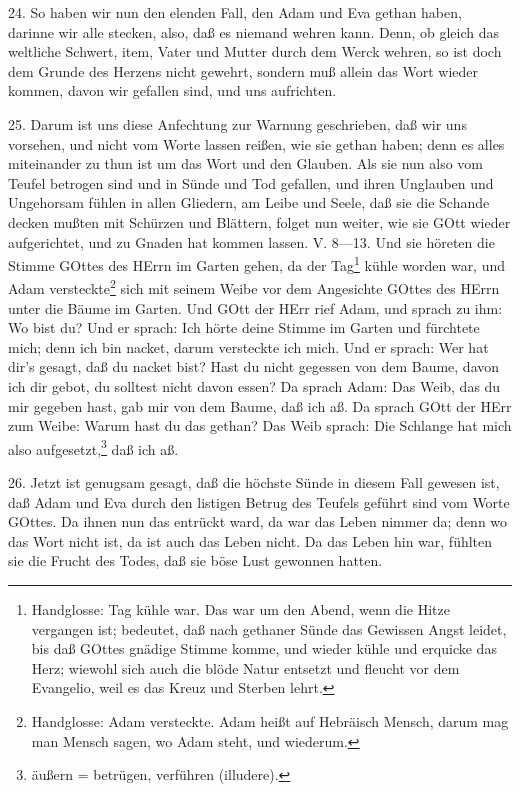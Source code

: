 24. So haben wir nun den elenden Fall, den Adam und Eva gethan haben, darinne wir alle stecken, also, daß es niemand wehren kann. Denn, ob gleich das weltliche Schwert, item, Vater und Mutter durch dem Werck wehren, so ist doch dem Grunde des Herzens nicht gewehrt, sondern muß allein das Wort wieder kommen, davon wir gefallen sind, und uns aufrichten.

25. Darum ist uns diese Anfechtung zur Warnung geschrieben, daß wir uns vorsehen, und nicht vom Worte lassen reißen, wie sie gethan haben; denn es alles miteinander zu thun ist um das Wort und den Glauben. Als sie nun also vom Teufel betrogen sind und in Sünde und Tod gefallen, und ihren Unglauben und Ungehorsam fühlen in allen Gliedern, am Leibe und Seele, daß sie die Schande decken mußten mit Schürzen und Blättern, folget nun weiter, wie sie GOtt wieder aufgerichtet, und zu Gnaden hat kommen lassen.
V. 8—13. Und sie höreten die Stimme GOttes des HErrn im Garten gehen, da der Tag\footnote{Handglosse: Tag kühle war. Das war um den Abend, wenn die Hitze vergangen ist; bedeutet, daß nach gethaner Sünde das Gewissen Angst leidet, bis daß GOttes gnädige Stimme komme, und wieder kühle und erquicke das Herz; wiewohl sich auch die blöde Natur entsetzt und fleucht vor dem Evangelio, weil es das Kreuz und Sterben lehrt.} kühle worden war, und Adam versteckte\footnote{Handglosse: Adam versteckte. Adam heißt auf Hebräisch Mensch, darum mag man Mensch sagen, wo Adam steht, und wiederum.} sich mit seinem Weibe vor dem Angesichte GOttes des HErrn unter die Bäume im Garten. Und GOtt der HErr rief Adam, und sprach zu ihm: Wo bist du? Und er sprach: Ich hörte deine Stimme im Garten und fürchtete mich; denn ich bin nacket, darum versteckte ich mich. Und er sprach: Wer hat dir’s gesagt, daß du nacket bist? Hast du nicht gegessen von dem Baume, davon ich dir gebot, du solltest nicht davon essen? Da sprach Adam: Das Weib, das du mir gegeben hast, gab mir von dem Baume, daß ich aß. Da sprach GOtt der HErr zum Weibe: Warum hast du das gethan? Das Weib sprach: Die Schlange hat mich also aufgesetzt,\footnote{äußern = betrügen, verführen (illudere).} daß ich aß.

26. Jetzt ist genugsam gesagt, daß die höchste Sünde in diesem Fall gewesen ist, daß Adam und Eva durch den listigen Betrug des Teufels geführt sind vom Worte GOttes. Da ihnen nun das entrückt ward, da war das Leben nimmer da; denn wo das Wort nicht ist, da ist auch das Leben nicht. Da das Leben hin war, fühlten sie die Frucht des Todes, daß sie böse Lust gewonnen hatten.

